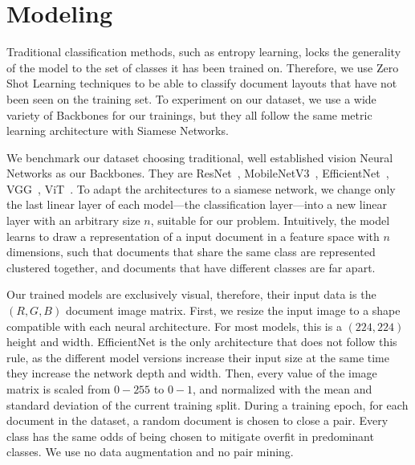 \section{Modeling}
\label{sec:method_modeling}

Traditional classification methods, such as entropy learning, locks the generality of the model to the set of classes it has been trained on. Therefore, we use Zero Shot Learning techniques to be able to classify document layouts that have not been seen on the training set. To experiment on our dataset, we use a wide variety of Backbones for our trainings, but they all follow the same metric learning architecture with Siamese Networks.

We benchmark our dataset choosing traditional, well established vision Neural Networks as our Backbones. They are ResNet~\cite{he_deep_2016}, MobileNetV3~\cite{howard_searching_2019}, EfficientNet~\cite{tan_efficientnet_2019}, VGG~\cite{simonyan_very_2015}, \gls{ViT}~\cite{dosovitskiy_image_2021}. To adapt the architectures to a siamese network, we change only the last linear layer of each model---the classification layer---into a new linear layer with an arbitrary size $n$, suitable for our problem. Intuitively, the model learns to draw a representation of a input document in a feature space with $n$ dimensions, such that documents that share the same class are represented clustered together, and documents that have different classes are far apart. 

Our trained models are exclusively visual, therefore, their input data is the $(R, G, B)$ document image matrix. First, we resize the input image to a shape compatible with each neural architecture. For most models, this is a $(224, 224)$ height and width. EfficientNet is the only architecture that does not follow this rule, as the different model versions increase their input size at the same time they increase the network depth and width. Then, every value of the image matrix is scaled from $0-255$ to $0-1$, and normalized with the mean and standard deviation of the current training split. During a training epoch, for each document in the dataset, a random document is chosen to close a pair. Every class has the same odds of being chosen to mitigate overfit in predominant classes. We use no data augmentation and no pair mining.

